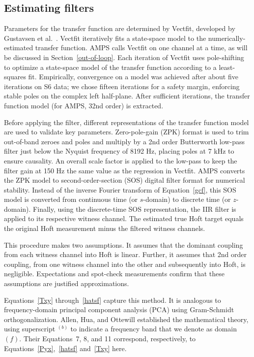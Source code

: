         \subsection{Estimating filters}
        \label{filter_est}

	Parameters for the transfer function are determined by Vectfit, developed by Gustavsen et al.~\cite{Deschrijver2008,Gustavsen2006,Gustavsen1999}. Vectfit iteratively fits a state-space model to the numerically-estimated transfer function. AMPS calls Vectfit on one channel at a time, as will be discussed in Section~\ref{out-of-loop}. Each iteration of Vectfit uses pole-shifting to optimize a state-space model of the transfer function according to a least-squares fit. Empirically, convergence on a model was achieved after about five iterations on S6 data; we chose fifteen iterations for a safety margin, enforcing stable poles on the complex left half-plane. After sufficient iterations, the transfer function model (for AMPS, 32nd order) is extracted. 

Before applying the filter, different representations of the transfer function model are used to validate key parameters. Zero-pole-gain (ZPK) format is used to trim out-of-band zeroes and poles and multiply by a 2nd order Butterworth low-pass filter just below the Nyquist frequency of 8192 Hz, placing poles at 7 kHz to ensure causality. An overall scale factor is applied to the low-pass to keep the filter gain at 150 Hz the same value as the regression in Vectfit. AMPS converts the ZPK model to second-order-section (SOS) digital filter format for numerical stability. Instead of the inverse Fourier transform of Equation~\ref{gcf}, this SOS model is converted from continuous time (or $s$-domain) to discrete time (or $z$-domain). Finally, using the discrete-time SOS representation, the IIR filter is applied to its respective witness channel. The estimated true Hoft target equals the original Hoft measurement minus the filtered witness channels. 

This procedure makes two assumptions. It assumes that the dominant coupling from each witness channel into Hoft is linear. Further, it assumes that 2nd order coupling, from one witness channel into the other and subsequently into Hoft, is negligible. Expectations and spot-check measurements confirm that these assumptions are justified approximations.  

	Equations~\ref{Txy} through~\ref{hatsf} capture this method. It is analogous to frequency-domain principal component analysis (PCA) using Gram-Schmidt orthogonalization. Allen, Hua, and Ottewill established the mathematical theory, using superscript $^{(b)}$ to indicate a frequency band that we denote as domain $(f)$. Their Equations~7, 8, and 11 correspond, respectively, to Equations~\ref{Pyx},~\ref{hatsf} and~\ref{Txy} here.

